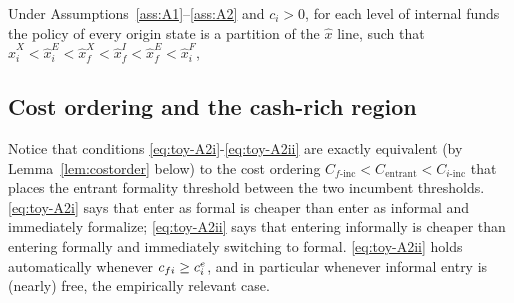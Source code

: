 \documentclass[12pt]{article}
\begin{document}
\begin{proposition}
\label{prop:ordering}
Under Assumptions~\ref{ass:A1}--\ref{ass:A2} and
$c_{i}>0$, for each level of internal funds the policy of every origin state is a partition of the $\hat x$ line, such that $ \hat x_i^X < \hat x_i^E < \hat x_f^X < \hat x_f^I < \hat x_f^E < \hat x_i^F $,

\begin{center}
\end{center}
\end{proposition}

\subsection{Cost ordering and the cash-rich region}

Notice that conditions \eqref{eq:toy-A2i}-\eqref{eq:toy-A2ii} are exactly equivalent (by Lemma~\ref{lem:costorder} below) to the cost ordering $C_{f\text{-inc}}<C_{\text{entrant}}<C_{i\text{-inc}}$ that places the entrant formality threshold between the two incumbent thresholds. \eqref{eq:toy-A2i} says that enter as formal is cheaper than enter as informal and immediately formalize; \eqref{eq:toy-A2ii} says that entering informally is cheaper than entering formally and immediately switching to formal. \eqref{eq:toy-A2ii} holds automatically whenever $c_{fi}\geq c^{e}_{i}$, and in particular whenever informal entry is (nearly) free, the empirically relevant case.
 
\end{document}
